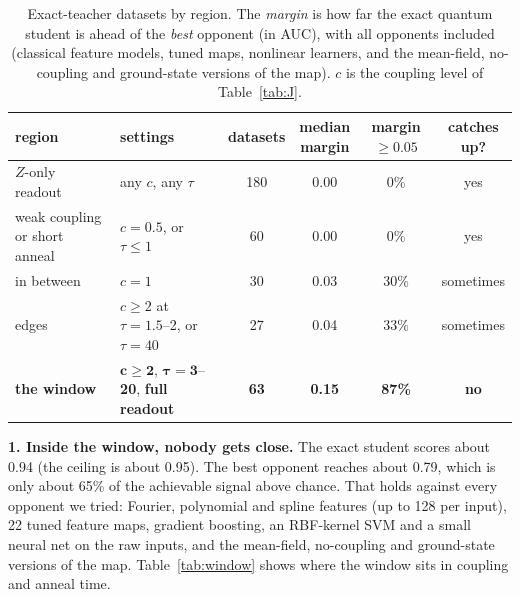 \documentclass[11pt]{article}
\begin{document}
\begin{table}[H]\centering\small
\caption{Exact-teacher datasets by region. The \emph{margin} is how far the exact quantum student is ahead of
the \emph{best} opponent (in AUC), with all opponents included (classical feature models, tuned maps,
nonlinear learners, and the mean-field, no-coupling and ground-state versions of the map). $c$ is the coupling
level of Table~\ref{tab:J}.}\label{tab:regions}
\begin{tabular}{@{}p{3.3cm}p{3.6cm}cccc@{}}\toprule
region & settings & datasets & \shortstack{median\\margin} & \shortstack{margin\\$\ge0.05$} & \shortstack{catches\\up?}\\\midrule
$Z$-only readout & any $c$, any $\tau$ & 180 & 0.00 & 0\% & yes\\
weak coupling or short anneal & $c=0.5$, or $\tau\le1$ & 60 & 0.00 & 0\% & yes\\
in between & $c=1$ & 30 & 0.03 & 30\% & sometimes\\
edges & $c\ge2$ at $\tau=1.5$--2, or $\tau=40$ & 27 & 0.04 & 33\% & sometimes\\
\textbf{the window} & $\boldsymbol{c\ge2}$, $\boldsymbol{\tau=3}$--\textbf{20}, \textbf{full readout} & \textbf{63} & \textbf{0.15} & \textbf{87\%} & \textbf{no}\\\bottomrule
\end{tabular}
\end{table}

\textbf{1. Inside the window, nobody gets close.} The exact student scores about 0.94 (the ceiling is about
0.95). The best opponent reaches about 0.79, which is only about 65\% of the achievable signal above chance.
That holds against every opponent we tried: Fourier, polynomial and spline features (up to 128 per input),
22 tuned feature maps, gradient boosting, an RBF-kernel SVM and a small neural net on the raw inputs, and the
mean-field, no-coupling and ground-state versions of the map. Table~\ref{tab:window} shows where the window
sits in coupling and anneal time.
\end{document}
